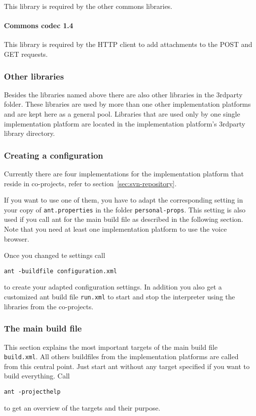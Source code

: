 \documentclass[11pt,a4paper]{article}
\begin{document}
This library is required by the other commons libraries.

\paragraph{Commons codec 1.4}
\label{sec:commons-logging}

This library is required by the HTTP client to add attachments to the POST and
GET requests.

\subsubsection{Other libraries}

Besides the libraries named above there are also other libraries in the
3rdparty folder. These libraries are used by more than one other implementation
platforms and are kept here as a general pool. Libraries that are used only by
one single implementation platform are located in the implementation platform's
3rdparty library directory.


\subsubsection{Creating a configuration}

Currently there are four implementations for the implementation platform
that reside in co-projects, refer to section~\ref{sec:svn-repository}.

If you want to use one of them, you have to adapt the corresponding setting
in your copy of \texttt{ant.properties} in the folder \texttt{personal-props}.
This setting is also used if you call ant for the main build file as described
in the following section.
Note that you need at least one implementation platform to use the voice
browser.

Once you changed te settings call
\begin{lstlisting}
ant -buildfile configuration.xml
\end{lstlisting}
to create your adapted configuration settings. In addition you also get
a customized ant build file \texttt{run.xml} to start and stop the interpreter
using the libraries from the co-projects.

\subsubsection{The main build file}
\label{sec:ant-build-file}

This section explains the most important targets of the main build file
\texttt{build.xml}. All others buildfiles from the implementation platforms
are called from this central point. Just start ant without any target specified
if you want to build everything. Call
\begin{lstlisting}
ant -projecthelp
\end{lstlisting}
to get an overview of the targets and their purpose.
\end{document}
